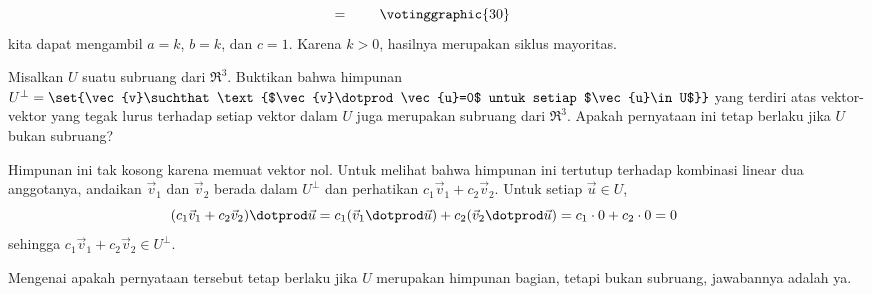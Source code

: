 \begin{exercises}
\begin{answer}
\begin{exparts}
\begin{equation*}
            =\hspace{.30in}
            \votinggraphic{30}  %
            \hspace{.30in}\hbox{}  
          \end{equation*}
          kita dapat mengambil $a=k$, $b=k$, dan $c=1$.
          Karena $k>0$, hasilnya merupakan siklus mayoritas.
       \end{exparts}
    \end{answer}
\item \label{exer:PerpIsSubSp} 
    Misalkan $U$ suatu subruang dari $\Re^3$.
    Buktikan bahwa himpunan
    $U^\perp=\set{\vec{v}\suchthat 
              \text{$\vec{v}\dotprod\vec{u}=0$ untuk setiap $\vec{u}\in U$}}$
    yang terdiri atas vektor-vektor
    yang tegak lurus terhadap setiap vektor dalam $U$ juga merupakan subruang dari $\Re^3$.
    Apakah pernyataan ini tetap berlaku jika $U$ bukan subruang?
    \begin{answer}
      Himpunan ini tak kosong karena memuat vektor nol.
      Untuk melihat bahwa himpunan ini tertutup terhadap kombinasi linear dua
      anggotanya, andaikan $\vec{v}_1$ dan $\vec{v}_2$ berada dalam $U^\perp$
      dan perhatikan $c_1\vec{v}_1+c_2\vec{v}_2$.
      Untuk setiap $\vec{u}\in U$,
      \begin{equation*}
        (c_1\vec{v}_1+c_2\vec{v}_2)\dotprod\vec{u}
        =c_1(\vec{v}_1\dotprod\vec{u})+c_2(\vec{v}_2\dotprod\vec{u})
        =c_1\cdot 0+c_2\cdot 0=0         
      \tag*{}\end{equation*}
      sehingga $c_1\vec{v}_1+c_2\vec{v}_2\in U^\perp$.

      Mengenai apakah pernyataan tersebut tetap berlaku jika $U$ merupakan himpunan bagian,
      tetapi bukan subruang, jawabannya adalah ya.
    \end{answer}
\end{exercises}
\endinput
